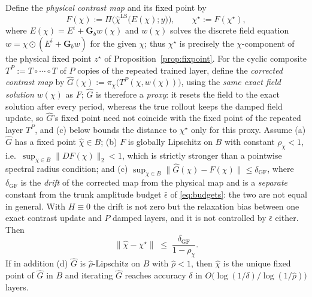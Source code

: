 \documentclass[journal,cmes,article,submit,moreauthors,pdftex]{Definitions/tsp}
\newcommand{\norm}[1]{\lVert #1 \rVert}
\begin{document}
\begin{Corollary}\label{cor:fidelity}
Define the \emph{physical contrast map} and its fixed point by
\begin{equation}\label{eq:chistar}
F(\chi):=\Pi\big(\hat\chi^{\mathrm{LS}}\big(E(\chi);y\big)\big),\qquad
\chi^{\star}:=F(\chi^{\star}),
\end{equation}
where $E(\chi)=E^i+\mathbf{G}_b w(\chi)$ and $w(\chi)$ solves the discrete field equation
$w=\chi\odot(E^i+\mathbf{G}_b w)$ for the given $\chi$; thus $\chi^{\star}$ is precisely the
$\chi$-component of the physical fixed point $z^{\star}$ of Proposition~\ref{prop:fixpoint}. For the
cyclic composite $T^{P}:=T\circ\cdots\circ T$ of $P$ copies of the repeated trained layer, define
the \emph{corrected contrast map} by $\hat G(\chi):=\pi_\chi\big(T^{P}(\chi,w(\chi))\big)$, using
the \emph{same exact field solution} $w(\chi)$ as $F$; $\hat G$ is therefore a \emph{proxy}: it resets
the field to the exact solution after every period, whereas the true rollout keeps the damped field
update, so $\hat G$'s fixed point need not coincide with the fixed point of the repeated layer $T^P$,
and (c) below bounds the distance to $\chi^\star$ only for this proxy. Assume
(a) $\hat G$ has a fixed point $\hat\chi\in B$; (b) $F$ is globally Lipschitz on $B$ with
constant $\rho_\chi<1$, i.e.\ $\sup_{\chi\in B}\norm{DF(\chi)}_2<1$, which is strictly stronger
than a pointwise spectral radius condition; and (c) $\sup_{\chi\in B}\norm{\hat G(\chi)-F(\chi)}\le\delta_{\mathrm{GF}}$, where
$\delta_{\mathrm{GF}}$ is the \emph{drift} of the corrected map from the physical map and is a
\emph{separate} constant from the trunk amplitude budget $\bar\epsilon$ of \eqref{eq:budgets}: the two
are not equal in general. With $H\equiv0$ the drift is not zero but the relaxation bias between one
exact contrast update and $P$ damped layers, and it is not controlled by $\bar\epsilon$ either.
Then
\begin{equation}\label{eq:fidelity}
\norm{\hat\chi-\chi^{\star}}\;\le\;\frac{\delta_{\mathrm{GF}}}{1-\rho_\chi}.
\end{equation}
If in addition (d) $\hat G$ is $\hat\rho$-Lipschitz on $B$ with $\hat\rho<1$, then $\hat\chi$ is the
unique fixed point of $\hat G$ in $B$ and iterating $\hat G$ reaches accuracy $\delta$ in
$O\big(\log(1/\delta)/\log(1/\hat\rho)\big)$ layers.
\end{Corollary}
\end{document}

